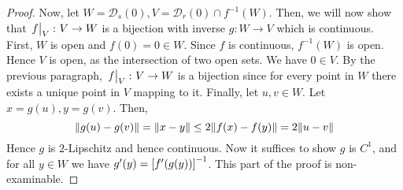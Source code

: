 \begin{proof}
	Now, let \( W = \mathcal D_s(0), V = \mathcal D_r(0) \cap f^{-1}(W) \).
	Then, we will now show that \( \eval{f}_V \colon V \to W \) is a bijection with inverse \( g \colon W \to V \) which is continuous.
	First, \( W \) is open and \( f(0) = 0 \in W \).
	Since \( f \) is continuous, \( f^{-1}(W) \) is open.
	Hence \( V \) is open, as the intersection of two open sets.
	We have \( 0 \in V \).
	By the previous paragraph, \( \eval{f}_V \colon V \to W \) is a bijection since for every point in \( W \) there exists a unique point in \( V \) mapping to it.
	Finally, let \( u, v \in W \).
	Let \( x = g(u), y = g(v) \).
	Then,
	\[
		\norm{g(u) - g(v)} = \norm{x - y} \leq 2 \norm{f(x) - f(y)} = 2\norm{u - v}
	\]
	Hence \( g \) is \( 2 \)-Lipschitz and hence continuous.
	Now it suffices to show \( g \) is \( C^1 \), and for all \( y \in W \) we have \( g'(y) = \qty[f'(g(y))]^{-1} \).
	This part of the proof is non-examinable.
\end{proof}

